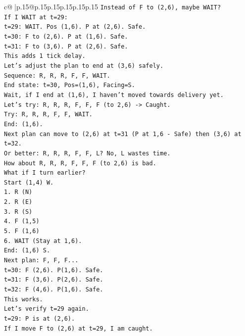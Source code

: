 \documentclass{article}
\begin{document}
{\begin{supertabular}{c@{$\;$}|p{.15\linewidth}@{}p{.15\linewidth}p{.15\linewidth}p{.15\linewidth}p{.15\linewidth}p{.15\linewidth}}
{{{\texttt{Instead of F to (2,6), maybe WAIT?} \\
\texttt{If I WAIT at t=29:} \\
\texttt{t=29: WAIT. Pos (1,6). P at (2,6). Safe.} \\
\texttt{t=30: F to (2,6). P at (1,6). Safe.} \\
\texttt{t=31: F to (3,6). P at (2,6). Safe.} \\
\texttt{This adds 1 tick delay.} \\
\texttt{Let's adjust the plan to end at (3,6) safely.} \\
\texttt{Sequence: R, R, R, F, F, WAIT.} \\
\texttt{End state: t=30, Pos=(1,6), Facing=S.} \\
\texttt{Wait, if I end at (1,6), I haven't moved towards delivery yet.} \\
\texttt{Let's try: R, R, R, F, F, F (to 2,6) {-}> Caught.} \\
\texttt{Try: R, R, R, F, F, WAIT.} \\
\texttt{End: (1,6).} \\
\texttt{Next plan can move to (2,6) at t=31 (P at 1,6 {-} Safe) then (3,6) at t=32.} \\
\texttt{Or better: R, R, R, F, F, L? No, L wastes time.} \\
\texttt{How about R, R, R, F, F, F (to 2,6) is bad.} \\
\texttt{What if I turn earlier?} \\
\texttt{Start (1,4) W.} \\
\texttt{1. R (N)} \\
\texttt{2. R (E)} \\
\texttt{3. R (S)} \\
\texttt{4. F (1,5)} \\
\texttt{5. F (1,6)} \\
\texttt{6. WAIT (Stay at 1,6).} \\
\texttt{End: (1,6) S.} \\
\texttt{Next plan: F, F, F...} \\
\texttt{t=30: F (2,6). P(1,6). Safe.} \\
\texttt{t=31: F (3,6). P(2,6). Safe.} \\
\texttt{t=32: F (4,6). P(1,6). Safe.} \\
\texttt{This works.} \\
\texttt{Let's verify t=29 again.} \\
\texttt{t=29: P is at (2,6).} \\
\texttt{If I move F to (2,6) at t=29, I am caught.} \\
}}}
\end{supertabular}}
\end{document}
